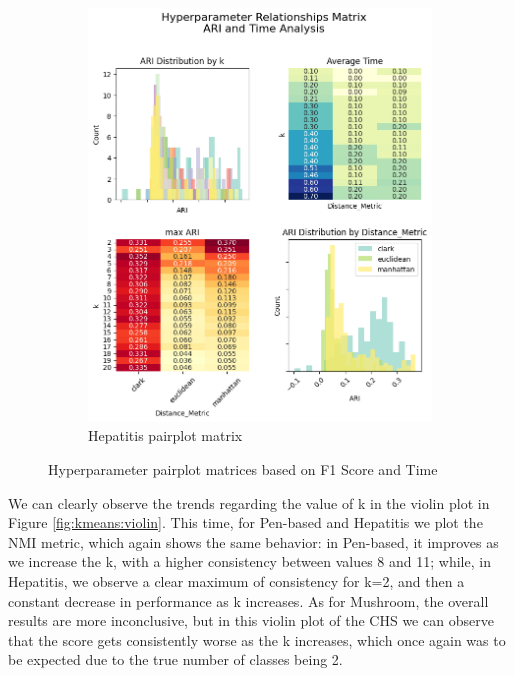 \begin{figure}[H]
\begin{subfigure}{0.49\textwidth}
        \includegraphics[width=\linewidth]{figures/KMeans/hepatitis_hyperparameter_pairplot_matrix.png}
        \caption{Hepatitis pairplot matrix}
    \end{subfigure}
    \caption{Hyperparameter pairplot matrices based on F1 Score and Time}
    \label{fig:pairplot}
\end{figure}

We can clearly observe the trends regarding the value of k in the violin plot in Figure \ref{fig:kmeans:violin}. This time, for Pen-based and Hepatitis we plot the NMI metric, which again shows the same behavior: in Pen-based, it improves as we increase the k, with a higher consistency between values 8 and 11; while, in Hepatitis, we observe a clear maximum of consistency for k=2, and then a constant decrease in performance as k increases. As for Mushroom, the overall results are more inconclusive, but in this violin plot of the CHS we can observe that the score gets consistently worse as the k increases, which once again was to be expected due to the true number of classes being 2.

